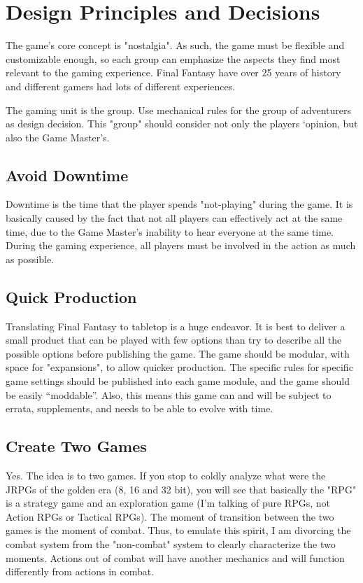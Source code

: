 \section{Design Principles and Decisions}
\label{sec:design}
\begin{multicols}{2}
The game's core concept is "nostalgia". As
such, the game must be flexible and customizable
enough, so each group can emphasize the aspects
they find most relevant to the gaming experience.
Final Fantasy have over 25 years of history and
different gamers had lots of different experiences.

The gaming unit is the group. Use
mechanical rules for the group of adventurers as
design decision. This "group" should consider not
only the players ‘opinion, but also the Game
Master's.
\subsection{Avoid Downtime}
\label{subsec:downtime}
Downtime is the time that the player spends
"not-playing" during the game. It is basically
caused by the fact that not all players can
effectively act at the same time, due to the Game
Master’s inability to hear everyone at the same
time. During the gaming experience, all players
must be involved in the action as much as possible.
\subsection{Quick Production}
\label{subsec:production}
Translating Final Fantasy to tabletop is a
huge endeavor. It is best to deliver a small product
that can be played with few options than try to
describe all the possible options before publishing
the game. The game should be modular, with space
for "expansions", to allow quicker production. The
specific rules for specific game settings should be
published into each game module, and the game
should be easily “moddable”. Also, this means this
game can and will be subject to errata,
supplements, and needs to be able to evolve with
time.
\subsection{Create Two Games}
\label{subsec:twogames}
Yes. The idea is to two games. If you stop to
coldly analyze what were the JRPGs of the golden
era (8, 16 and 32 bit), you will see that basically
the "RPG" is a strategy game and an exploration
game (I'm talking of pure RPGs, not Action RPGs or
Tactical RPGs). The moment of transition between
the two games is the moment of combat. Thus, to
emulate this spirit, I am divorcing the combat
system from the "non-combat" system to clearly
characterize the two moments. Actions out of
combat will have another mechanics and will
function differently from actions in combat.

\end{multicols}
